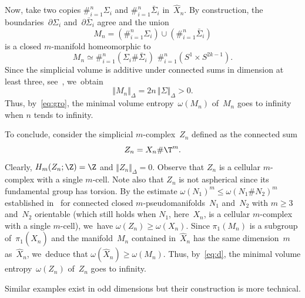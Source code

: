 Now, take two copies $\#_{i=1}^n \Sigma_i$ and $\#_{i=1}^n \bar{\Sigma}_i$ in~$\widehat{X}_n$.
By construction, the boundaries~$\partial \Sigma_i$ and~$\partial \bar{\Sigma}_i$ agree and the union
\[
M_n = (\#_{i=1}^n \Sigma_i) \cup (\#_{i=1}^n \bar{\Sigma}_i)
\]
is a closed $m$\nobreakdash-manifold homeomorphic to
\[
M_n \simeq \#_{i=1}^n (\Sigma_i \# \bar{\Sigma}_i) \, \, \#_{i=1}^n (S^1 \times S^{2k-1}).
\]
Since the simplicial volume is additive under connected sums in dimension at least three, see~\cite{gro82}, we~obtain
\[
\Vert M_n \Vert_\Delta = 2n \, \Vert \Sigma \Vert_\Delta > 0.
\]
Thus, by~\eqref{eq:gro}, the minimal volume entropy~$\omega(M_n)$ of~$M_n$ goes to infinity when $n$ tends to infinity.

To conclude, consider the simplicial $m$\nobreakdash-complex~$Z_n$ defined as the connected sum
\[
Z_n= X_n \# \T^m.
\]
Clearly, $H_m(Z_n;\Z)=\Z$ and $\Vert Z_n \Vert_\Delta = 0$.
Observe that $Z_n$ is a cellular $m$\nobreakdash-complex with a single $m$\nobreakdash-cell.
Note also that $Z_n$ is not aspherical since its fundamental group has torsion.
By the estimate $\omega(N_1)^m \leq \omega(N_1 \# N_2)^m$ established in~\cite[Th.\,2.12]{BS} for connected closed $m$\nobreakdash-pseudomanifolds~$N_1$ and~$N_2$ with $m \geq 3$ and~$N_2$ orientable (which still holds when $N_1$, here~$X_n$, is a cellular $m$\nobreakdash-complex with a single $m$\nobreakdash-cell), we~have $\omega(Z_n) \geq \omega(X_n)$.
Since $\pi_1(M_n)$ is a subgroup of~$\pi_1(\widehat{X}_n)$ and the manifold~$M_n$ contained in~$\widehat{X}_n$ has the same dimension~$m$ as~$\widehat{X}_n$, we~deduce that $\omega(\widehat{X}_n) \geq \omega(M_n)$.
Thus, by~\eqref{eq:d}, the minimal volume entropy~$\omega(Z_n)$ of~$Z_n$ goes to infinity.

\begin{remark}
Similar examples exist in odd dimensions but their construction is more technical.
\end{remark}

